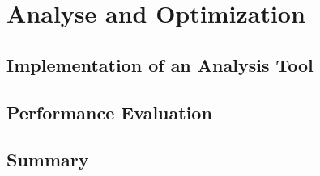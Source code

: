 \chapter{Analyse and Optimization}
\label{chap:controller}


\section{Implementation of an Analysis Tool}
\label{sec:controller:design}

\section{Performance Evaluation}
\label{sec:controller:evaluation}


\section{Summary}
\label{sec:controller:conclusion}

